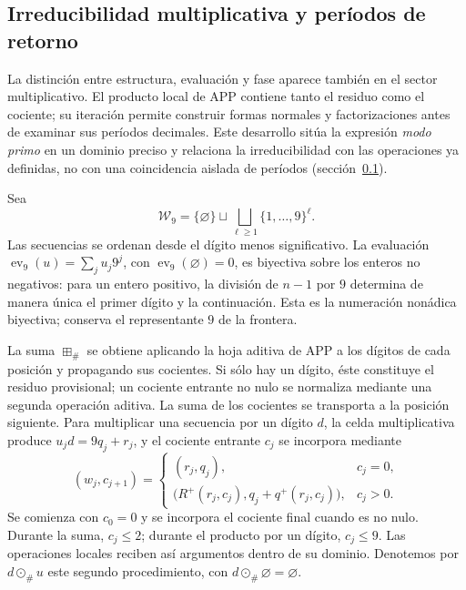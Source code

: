 \subsection{Irreducibilidad multiplicativa y períodos de retorno}
\label{primos-retornos}

La distinción entre estructura, evaluación y fase aparece también en el
sector multiplicativo. El producto local de APP contiene tanto el residuo
como el cociente; su iteración permite construir formas normales y
factorizaciones antes de examinar sus períodos decimales. Este desarrollo
sitúa la expresión \emph{modo primo} en un dominio preciso y relaciona la
irreducibilidad con las operaciones ya definidas, no con una coincidencia
aislada de períodos (sección~\ref{primos-retornos}).

Sea
\[
 \mathcal W_9=\{\varnothing\}\sqcup
 \bigsqcup_{\ell\geq1}\{1,\ldots,9\}^{\ell}.
\]
Las secuencias se ordenan desde el dígito menos significativo. La evaluación
\(\operatorname{ev}_9(u)=\sum_j u_j9^j\), con
\(\operatorname{ev}_9(\varnothing)=0\), es biyectiva sobre los enteros no
negativos: para un entero positivo, la división de \(n-1\) por \(9\)
determina de manera única el primer dígito y la continuación. Esta es la
numeración nonádica biyectiva; conserva el representante \(9\) de la
frontera.

La suma \(\boxplus_\#\) se obtiene aplicando la hoja aditiva de APP a los
dígitos de cada posición y propagando sus cocientes. Si sólo hay un dígito,
éste constituye el residuo provisional; un cociente entrante no nulo se
normaliza mediante una segunda operación aditiva. La suma de los
cocientes se transporta a la posición siguiente. Para multiplicar una
secuencia por un dígito \(d\), la celda multiplicativa produce
\(u_jd=9q_j+r_j\), y el cociente entrante \(c_j\) se incorpora mediante
\[
 (w_j,c_{j+1})=
 \begin{cases}
 (r_j,q_j),&c_j=0,\\
 \bigl(R^+(r_j,c_j),q_j+q^+(r_j,c_j)\bigr),&c_j>0.
 \end{cases}
\]
Se comienza con \(c_0=0\) y se incorpora el cociente final cuando es no
nulo. Durante la suma, \(c_j\leq2\); durante el producto por un dígito,
\(c_j\leq9\). Las operaciones locales reciben así argumentos dentro
de su dominio. Denotemos por \(d\odot_\#u\) este segundo procedimiento,
con \(d\odot_\#\varnothing=\varnothing\).

